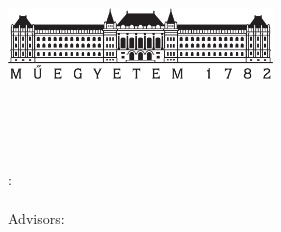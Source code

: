 \begin{titlepage}
  \begin{center}  
  \includegraphics[width=7cm]{./figures/bme_logo.pdf}
  \vspace{0.3cm}
  
  \bme \\
  \vik \\
  \viktanszek \\
  \vspace{5cm}
  
  \huge {\vikcim}
  \vspace{1.5cm}
  
  \large {\textbf{\vikdoktipus}}
  \vfill
    
  {\Large 
  	\keszitette: \\ \vspace{0.3cm}
  	\szerzo \\
  	\vspace{1.5cm}
  	Advisors: \\ \vspace{0.3cm}
  	\vikkonzulensA \\
  	\vikkonzulensB \\
  }
  
  \vspace{2cm}
  \large {\tdkev}
 \end{center}
\end{titlepage}
